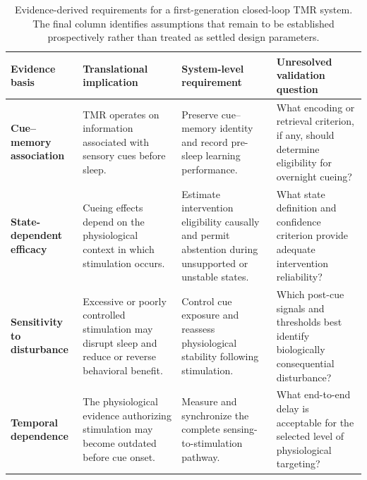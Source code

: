 \begin{table}[t]

\centering

\caption{
Evidence-derived requirements for a first-generation closed-loop TMR system.
The final column identifies assumptions that remain to be established
prospectively rather than treated as settled design parameters.
}

\label{tab:translation_requirements}

\footnotesize
\setlength{\tabcolsep}{4.5pt}
\renewcommand{\arraystretch}{1.22}

\begin{tabularx}{\textwidth}{
@{}
>{\raggedright\arraybackslash}p{2.7cm}
>{\raggedright\arraybackslash}X
>{\raggedright\arraybackslash}X
>{\raggedright\arraybackslash}X
@{}
}

\toprule

\textbf{Evidence basis}
&
\textbf{Translational implication}
&
\textbf{System-level requirement}
&
\textbf{Unresolved validation question}
\\

\midrule

\textbf{Cue--memory association}
&
TMR operates on information associated with sensory cues before sleep.
&
Preserve cue--memory identity and record pre-sleep learning performance.
&
What encoding or retrieval criterion, if any, should determine eligibility for
overnight cueing?
\\

\addlinespace[1.2mm]

\textbf{State-dependent efficacy}
&
Cueing effects depend on the physiological context in which stimulation occurs.
&
Estimate intervention eligibility causally and permit abstention during
unsupported or unstable states.
&
What state definition and confidence criterion provide adequate intervention
reliability?
\\

\addlinespace[1.2mm]

\textbf{Sensitivity to disturbance}
&
Excessive or poorly controlled stimulation may disrupt sleep and reduce or
reverse behavioral benefit.
&
Control cue exposure and reassess physiological stability following
stimulation.
&
Which post-cue signals and thresholds best identify biologically consequential
disturbance?
\\

\addlinespace[1.2mm]

\textbf{Temporal dependence}
&
The physiological evidence authorizing stimulation may become outdated before
cue onset.
&
Measure and synchronize the complete sensing-to-stimulation pathway.
&
What end-to-end delay is acceptable for the selected level of physiological
targeting?
\\


\end{tabularx}
\end{table}
